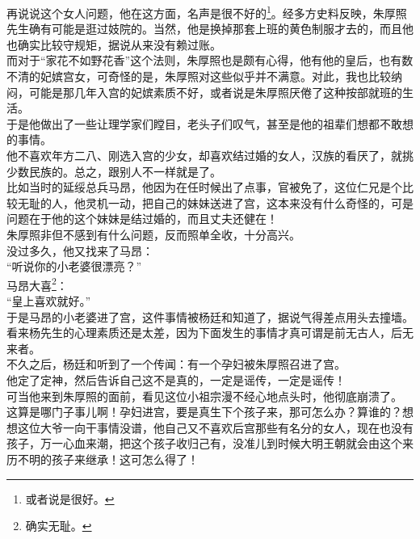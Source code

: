 \begin{multicols}{\theparacolNo}
再说说这个女人问题，他在这方面，名声是很不好的\footnote{或者说是很好。}。经多方史料反映，朱厚照先生确有可能是逛过妓院的。当然，他是换掉那套上班的黄色制服才去的，而且他也确实比较守规矩，据说从来没有赖过账。\\

而对于“家花不如野花香”这个法则，朱厚照也是颇有心得，他有他的皇后，也有数不清的妃嫔宫女，可奇怪的是，朱厚照对这些似乎并不满意。对此，我也比较纳闷，可能是那几年入宫的妃嫔素质不好，或者说是朱厚照厌倦了这种按部就班的生活。\\

于是他做出了一些让理学家们瞠目，老头子们叹气，甚至是他的祖辈们想都不敢想的事情。\\

他不喜欢年方二八、刚选入宫的少女，却喜欢结过婚的女人，汉族的看厌了，就挑少数民族的。总之，跟别人不一样就是了。\\

比如当时的延绥总兵马昂，他因为在任时候出了点事，官被免了，这位仁兄是个比较无耻的人，他灵机一动，把自己的妹妹送进了宫，这本来没有什么奇怪的，可是问题在于他的这个妹妹是结过婚的，而且丈夫还健在！\\

朱厚照非但不感到有什么问题，反而照单全收，十分高兴。\\

没过多久，他又找来了马昂：\\

“听说你的小老婆很漂亮？”\\

马昂大喜\footnote{确实无耻。}：\\

“皇上喜欢就好。”\\

于是马昂的小老婆进了宫，这件事情被杨廷和知道了，据说气得差点用头去撞墙。\\

看来杨先生的心理素质还是太差，因为下面发生的事情才真可谓是前无古人，后无来者。\\

不久之后，杨廷和听到了一个传闻：有一个孕妇被朱厚照召进了宫。\\

他定了定神，然后告诉自己这不是真的，一定是谣传，一定是谣传！\\

可当他来到朱厚照的面前，看见这位小祖宗漫不经心地点头时，他彻底崩溃了。\\

这算是哪门子事儿啊！孕妇进宫，要是真生下个孩子来，那可怎么办？算谁的？想想这位大爷一向干事情没谱，他自己又不喜欢后宫那些有名分的女人，现在也没有孩子，万一心血来潮，把这个孩子收归己有，没准儿到时候大明王朝就会由这个来历不明的孩子来继承！这可怎么得了！\\


\end{multicols}
